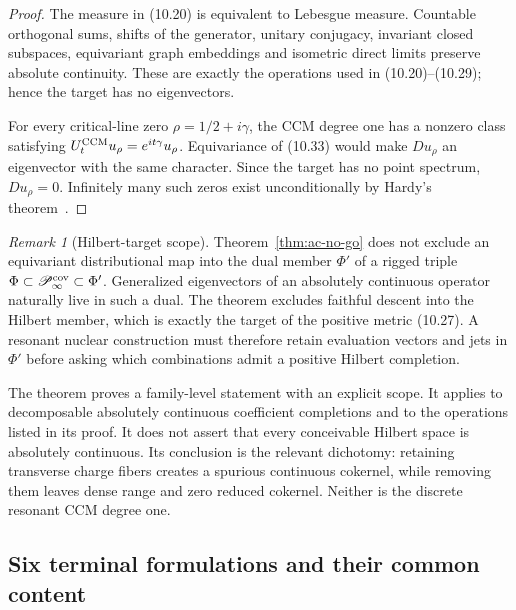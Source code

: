 \documentclass[11pt]{amsart}
\theoremstyle{definition}
\theoremstyle{remark}
\newtheorem{remark}[theorem]{Remark}
\begin{document}
\begin{proof}
The measure in (10.20) is equivalent to Lebesgue measure.  Countable
orthogonal sums, shifts of the generator, unitary conjugacy, invariant
closed subspaces, equivariant graph embeddings and isometric direct limits
preserve absolute continuity.  These are exactly the operations used in
(10.20)--(10.29); hence the target has no eigenvectors.

For every critical-line zero
\(\rho=1/2+i\gamma\), the CCM degree one has a nonzero class satisfying
\(U_t^{\rm CCM}u_\rho=e^{it\gamma}u_\rho\).  Equivariance of (10.33)
would make \(Du_\rho\) an eigenvector with the same character.  Since the
target has no point spectrum, \(Du_\rho=0\).  Infinitely many such zeros
exist unconditionally by Hardy's theorem~\cite{Hardy1914}.
\end{proof}

\begin{remark}[Hilbert-target scope]
Theorem~\ref{thm:ac-no-go} does not exclude an equivariant distributional
map into the dual member \(\Phi'\) of a rigged triple
\(\Phi\subset\mathscr P_\infty^{\rm cov}\subset\Phi'\).  Generalized
eigenvectors of an absolutely continuous operator naturally live in such a
dual.  The theorem excludes faithful descent into the Hilbert member, which
is exactly the target of the positive metric (10.27).  A resonant nuclear
construction must therefore retain evaluation vectors and jets in
\(\Phi'\) before asking which combinations admit a positive Hilbert
completion.
\end{remark}

The theorem proves a family-level statement with an explicit scope.  It
applies to decomposable absolutely continuous coefficient completions and
to the operations listed in its proof.  It does not assert that every
conceivable Hilbert space is absolutely continuous.  Its conclusion is the
relevant dichotomy: retaining transverse charge fibers creates a spurious
continuous cokernel, while removing them leaves dense range and zero
reduced cokernel.  Neither is the discrete resonant CCM degree one.

\subsection{Six terminal formulations and their common content}
\label{subsec:six-terminal}
\end{document}

